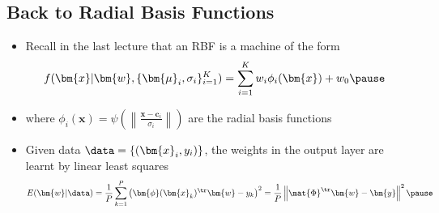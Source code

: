\begin{slide}
\section[-1]{Back to Radial Basis Functions}

\begin{PauseHighLight}
  \begin{itemize}
  \item Recall in the last lecture that an RBF is a machine of the form
    \begin{align*}
      f(\bm{x}|\bm{w},\{\bm{\mu}_i,\sigma_i\}_{i=1}^K) &=
      \sum_{i=1}^K w_i \phi_i(\bm{x}) + w_0\pause
    \end{align*}
  \item where $\phi_i(\bm{x}) =
    \psi\left(\left\|\frac{\bm{x}-\bm{c}_i}{\sigma_i}\right\|\right)$
    are the radial basis functions\pause
  \item Given data $\data=\{(\bm{x}_i,y_i)\}$, the weights in the output
    layer are learnt by linear least squares
    \begin{displaymath}
      E(\bm{w}|\data) = \frac{1}{P} \sum_{k=1}^P 
      \left( \strut \bm{\phi}(\bm{x}_k)^\tr \bm{w} -y_k \right)^2
      = \frac{1}{P} \left\| \strut \mat{\Phi}^\tr \bm{w} -
        \bm{y}  \right\|^2\pause
    \end{displaymath}
   \end{itemize}
\end{PauseHighLight}

\end{slide}


